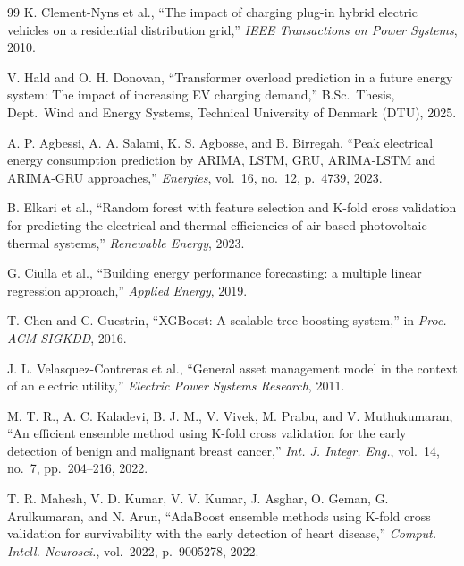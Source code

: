 \documentclass[conference]{IEEEtran}
\begin{document}
\begin{thebibliography}{99}
K. Clement-Nyns et al., ``The impact of charging plug-in hybrid electric vehicles on a residential distribution grid,'' \textit{IEEE Transactions on Power Systems}, 2010.

V. Hald and O. H. Donovan, ``Transformer overload prediction in a future energy system: The impact of increasing EV charging demand,'' B.Sc.\ Thesis, Dept.\ Wind and Energy Systems, Technical University of Denmark (DTU), 2025.

A. P. Agbessi, A. A. Salami, K. S. Agbosse, and B. Birregah, ``Peak electrical energy consumption prediction by ARIMA, LSTM, GRU, ARIMA-LSTM and ARIMA-GRU approaches,'' \textit{Energies}, vol.~16, no.~12, p.~4739, 2023.

B. Elkari et al., ``Random forest with feature selection and K-fold cross validation for predicting the electrical and thermal efficiencies of air based photovoltaic-thermal systems,'' \textit{Renewable Energy}, 2023.

G. Ciulla et al., ``Building energy performance forecasting: a multiple linear regression approach,'' \textit{Applied Energy}, 2019.

T. Chen and C. Guestrin, ``XGBoost: A scalable tree boosting system,'' in \textit{Proc. ACM SIGKDD}, 2016.

J. L. Velasquez-Contreras et al., ``General asset management model in the context of an electric utility,'' \textit{Electric Power Systems Research}, 2011.

M. T. R., A. C. Kaladevi, B. J. M., V. Vivek, M. Prabu, and V. Muthukumaran, ``An efficient ensemble method using K-fold cross validation for the early detection of benign and malignant breast cancer,'' \textit{Int. J. Integr. Eng.}, vol.~14, no.~7, pp.~204--216, 2022.




T. R. Mahesh, V. D. Kumar, V. V. Kumar, J. Asghar, O. Geman, G. Arulkumaran, and N. Arun, ``AdaBoost ensemble methods using K-fold cross validation for survivability with the early detection of heart disease,'' \textit{Comput. Intell. Neurosci.}, vol.~2022, p.~9005278, 2022.


\end{thebibliography}
\end{document}
